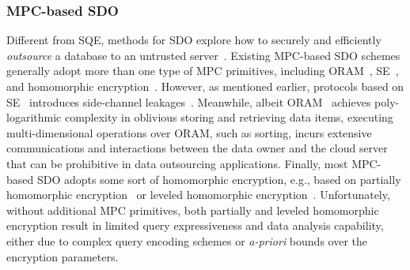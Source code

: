\subsubsection{{MPC-based SDO}}
Different from SQE, methods for SDO explore
how to securely and efficiently {\it{outsource}} a database to an untrusted 
server~\cite{cryptdb,seabed,poddar12arx,sagma,aphadb,heda}. 
Existing MPC-based 
SDO schemes generally adopt more than one type of MPC primitives, including
ORAM~\cite{eskandarian2017oblidb}, SE~\cite{poddar12arx, seabed, sagma}, and 
homomorphic encryption~\cite{cryptdb, eskandarian2017oblidb, sagma}.
However, as mentioned earlier, protocols based on SE~\cite{curtmola2006searchable,cash2013highly} 
introduces side-channel
leakages~\cite{islam2012access,cash2015leakage,grubbs2018pump,grubbs2019learning,
gui2019encrypted}.
Meanwhile, albeit ORAM~\cite{stefanov2018path} achieves poly-logarithmic complexity
in oblivious storing and retrieving data items, executing multi-dimensional 
operations over ORAM, such as sorting, incurs extensive communications
and interactions between the data owner and the cloud server that can be prohibitive
in data outsourcing applications. Finally, most MPC-based SDO adopts some sort of
homomorphic encryption, e.g., based on partially homomorphic
encryption~\cite{cryptdb,poddar12arx, seabed, sagma} or 
leveled homomorphic encryption~\cite{aphadb}. Unfortunately, 
without additional MPC primitives, both partially and leveled homomorphic
encryption result in limited query expressiveness 
and data analysis capability,
either due to complex query encoding schemes or {\it{a-priori}} bounds over
the encryption parameters.


